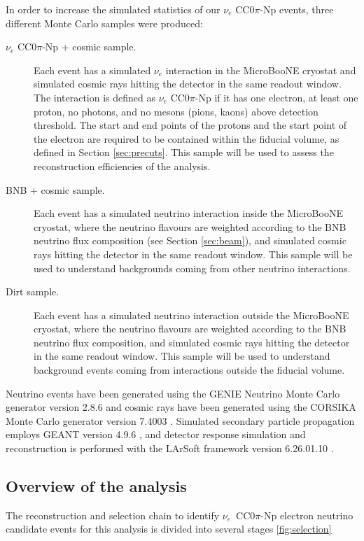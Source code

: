 In order to increase the simulated statistics of our $\nu_e$ CC0$\pi$-Np events, three different Monte Carlo samples were produced:
\begin{description}
\item[$\nu_{e}$ CC0$\pi$-Np + cosmic sample.] Each event has a simulated $\nu_{e}$ interaction in the MicroBooNE cryostat and simulated cosmic rays hitting the detector in the same readout window. The interaction is defined as $\nu_{e}$ CC0$\pi$-Np if it has one electron, at least one proton, no photons, and no mesons (pions, kaons) above detection threshold. The start and end points of the protons and the start point of the electron are required to be contained within the fiducial volume, as defined in Section \ref{sec:precuts}. This sample will be used to assess the reconstruction efficiencies of the analysis.
\item[BNB + cosmic sample.] Each event has a simulated neutrino interaction inside the MicroBooNE cryostat, where the neutrino flavours are weighted according to the BNB neutrino flux composition (see Section \ref{sec:beam}), and simulated cosmic rays hitting the detector in the same readout window. This sample will be used to understand backgrounds coming from other neutrino interactions.
\item[Dirt sample.] Each event has a simulated neutrino interaction outside the MicroBooNE cryostat, where the neutrino flavours are weighted according to the BNB neutrino flux composition, and simulated cosmic rays hitting the detector in the same readout window. This sample will be used to understand background events coming from interactions outside the fiducial volume.
\end{description}

Neutrino events have been generated using the GENIE Neutrino Monte Carlo generator version 2.8.6 \cite{Andreopoulos:2009rq} and cosmic rays have been generated using the CORSIKA Monte Carlo generator version 7.4003 \cite{Heck:1998vt}. Simulated secondary particle propagation employs GEANT version 4.9.6 \cite{Brun:1994aa}, and detector response simulation and reconstruction is performed with the LArSoft framework version 6.26.01.10 \cite{Church:2013hea}.

\subsection{Overview of the analysis}
The reconstruction and selection chain to identify $\nu_{e}$~CC0$\pi$-Np electron neutrino candidate events for this analysis is divided into several stages \ref{fig:selection} 

